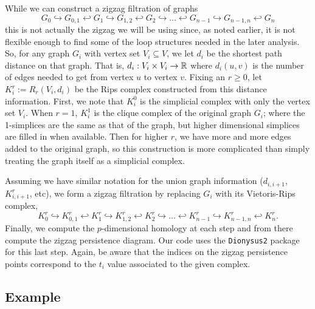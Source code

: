While we can construct a zigzag filtration of graphs 
\begin{equation*}
G_{0} 
\hookrightarrow G_{0,1} 
\hookleftarrow G_{1} 
\hookrightarrow G_{1,2} 
\hookleftarrow G_{2} 
\hookrightarrow \ldots 
\hookleftarrow G_{{n-1}}  
\hookrightarrow G_{{n-1},{n}} 
\hookleftarrow G_{n}
%
\end{equation*}
this is not actually the zigzag we will be using since, as noted earlier, it is not flexible enough to find some of the loop structures needed in the later analysis. 
So, for any graph $G_i$ with vertex set $V_i \subseteq V$, we let $d_i$ be the shortest path distance on that graph. 
That is, $d_i:V_i \times V_i \to \mathbb{R}$ where $d_i(u,v)$ is the number of edges needed to get from vertex $u$ to vertex $v$. 
Fixing an $r\geq 0$, let $K_{i}^r:=R_r(V_i, d_i)$ be the Rips complex constructed from this distance information. 
First, we note that $K_i^0$ is the simplicial complex with only the vertex set $V_i$. 
When $r=1$, $K_i^1$ is the clique complex of the original graph $G_i$; where the 1-simplices are the same as that of the graph, but higher dimensional simplices are filled in when available. 
Then for higher $r$, we have more and more edges added to the original graph, so this construction is more complicated than simply treating the graph itself as a simplicial complex. 


Assuming we have similar notation for the union graph information ($d_{i,{i+1}}$, $K_{i,{i+1}}^r$, etc), we form a zigzag filtration by replacing $G_i$ with its Vietoris-Rips complex,
\begin{equation*}
 K_{0}^r %
\hookrightarrow K_{0,1}^r %
\hookleftarrow K_{1}^r %
\hookrightarrow K_{1,2}^r %
\hookleftarrow K_{2}^r %
\hookrightarrow \ldots 
\hookleftarrow K_{{n-1}}^r %
\hookrightarrow K_{{n-1},{n}}^r %
\hookleftarrow K_{n}^r. %
%
\end{equation*}
Finally, we compute the $p$-dimensional homology at each step and from there compute the zigzag persistence diagram. 
Our code uses the \texttt{Dionysus2} package \cite{Dionysus2} for this last step.
Again, be aware that the indices on the zigzag persistence points correspond to the $t_i$ value associated to the given complex.
%
%
%
%
%




%
%
%

%
%
%
%
%
%
%

%
%
%
%


%
%
%
%
%
%
%
%
%


\subsection{Example} 
\label{ssec:example}

